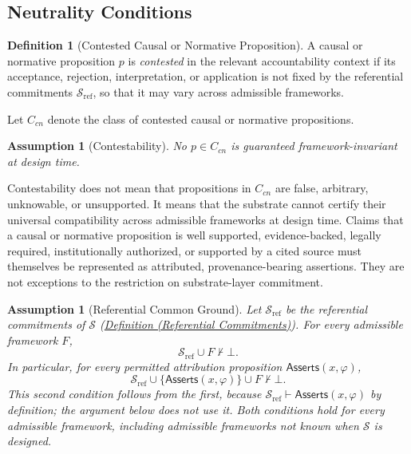 \documentclass[11pt]{article}
\theoremstyle{plain}
\newtheorem{assumption}[theorem]{Assumption}
\theoremstyle{definition}
\newtheorem{definition}[theorem]{Definition}
\theoremstyle{remark}
\newcommand{\DefRef}[2]{\hyperref[#1]{Definition (#2)}}
\newcommand{\Substrate}{\mathcal{S}}
\newcommand{\SubstrateRef}{\mathcal{S}_{\mathrm{ref}}}
\newcommand{\Framework}{F}
\newcommand{\entails}{\vdash}
\newcommand{\notentails}{\nvdash}
\newcommand{\Asserts}{\mathsf{Asserts}}
\begin{document}
\subsection*{Neutrality Conditions}



\begin{definition}[Contested Causal or Normative Proposition]
  \label{se100.def.ContestedCausalNormative}
  A causal or normative proposition $p$ is \emph{contested}
  in the relevant accountability context
  if its acceptance, rejection, interpretation, or application
  is not fixed by the referential commitments $\SubstrateRef$,
  so that it may vary across admissible frameworks.

  Let $C_{cn}$ denote the class of contested causal or normative propositions.
\end{definition}

\begin{assumption}[Contestability]
  \label{se100.assump.Contestability}
  No $p \in C_{cn}$ is guaranteed framework-invariant at design time.
\end{assumption}

Contestability does not mean that propositions in $C_{cn}$ are
false, arbitrary, unknowable, or unsupported.
It means that the substrate cannot certify their universal compatibility
across admissible frameworks at design time.
Claims that a causal or normative proposition is
well supported,
evidence-backed,
legally required,
institutionally authorized,
or supported by a cited source
must themselves be represented as attributed, provenance-bearing assertions.
They are not exceptions to the restriction on substrate-layer commitment.


\begin{assumption}[Referential Common Ground]
  \label{se100.assump.ReferentialCommonGround}
  Let $\SubstrateRef$ be the referential commitments of $\Substrate$
  (\DefRef{se100.def.ReferentialCommitments}{Referential Commitments}).
  For every admissible framework $\Framework$,
  \[
    \SubstrateRef \cup \Framework \notentails \bot .
  \]
  In particular, for every permitted attribution proposition
  $\Asserts(x,\varphi)$,
  \[
    \SubstrateRef \cup \{\Asserts(x,\varphi)\} \cup \Framework
    \notentails \bot .
  \]
  This second condition follows from the first,
  because $\SubstrateRef \entails \Asserts(x,\varphi)$ by definition;
  the argument below does not use it.
  Both conditions hold for every admissible framework,
  including admissible frameworks not known when $\Substrate$ is designed.
\end{assumption}
\end{document}
